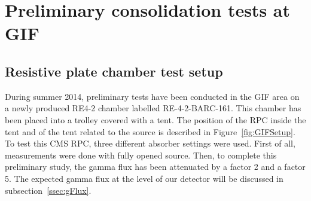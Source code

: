 		

\section{Preliminary consolidation tests at GIF}
\label{sec:GIFtests}
				
	\subsection{Resistive plate chamber test setup}
	\label{ssec:RPCSetup}
	
		During summer 2014, preliminary tests have been conducted in the GIF area on a newly produced RE4-2 chamber labelled RE-4-2-BARC-161. This chamber has been placed into a trolley covered with a tent. The position of the RPC inside the tent and of the tent related to the source is described in Figure~\ref{fig:GIFSetup}. To test this CMS RPC, three different absorber settings were used. First of all, measurements were done with fully opened source. Then, to complete this preliminary study, the gamma flux has been attenuated by a factor 2 and a factor 5. The expected gamma flux at the level of our detector will be discussed in subsection~\ref{ssec:gFlux}.

